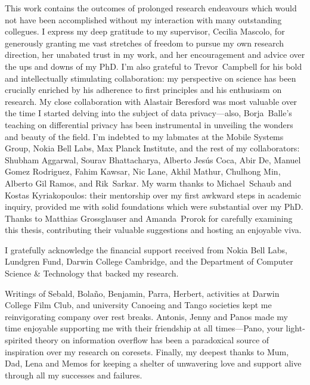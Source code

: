 
\begin{acknowledgements}
This work contains the outcomes of prolonged research endeavours which would not have been accomplished without my interaction with many outstanding collegues. I express my deep gratitude to my supervisor, Cecilia Mascolo, for generously granting me vast stretches of freedom to pursue my own research direction, her unabated trust in my work, and her encouragement and advice over the ups and downs of my PhD. I'm also grateful to \mbox{Trevor Campbell} for his bold and intellectually stimulating collaboration: my perspective on science has been crucially enriched by his adherence to first principles and his enthusiasm on research. My close collaboration with Alastair Beresford was most valuable over the time I started delving into the subject of data privacy---also, \mbox{Borja Balle's} teaching on differential privacy has been instrumental in unveiling the wonders and beauty of the field. I'm indebted to my labmates at the Mobile Systems Group, Nokia Bell Labs, Max Planck Institute, and the rest of my collaborators: Shubham Aggarwal, Sourav Bhattacharya, Alberto Jes\'{u}s Coca, Abir De, Manuel Gomez Rodriguez, Fahim Kawsar, Nic Lane,  Akhil Mathur, Chulhong Min, Alberto Gil Ramos, and \mbox{Rik Sarkar}. My warm thanks to \mbox{Michael Schaub} and Kostas Kyriakopoulos: their mentorship over my first awkward steps in academic inquiry, provided me with solid foundations which were substantial over my PhD. Thanks to Matthias Grossglauser and \mbox{Amanda Prorok} for carefully examining this thesis, contributing their valuable suggestions and hosting an enjoyable viva.

I gratefully acknowledge the financial support received from Nokia Bell Labs, Lundgren Fund, Darwin College Cambridge, and the Department of Computer Science \& Technology that backed my research. 

Writings of Sebald, Bola{\~{n}}o, Benjamin, Parra, Herbert, activities at Darwin College Film Club, and university Canoeing and Tango societies kept me reinvigorating company over rest breaks. Antonis, Jenny and Panos made my time enjoyable supporting me with their friendship at all times---Pano, your light-spirited theory on information overflow has been a paradoxical source of inspiration over my research on coresets. Finally, my deepest thanks to Mum, Dad, Lena and Memos for keeping a shelter of unwavering love and support alive through all my successes and failures.
\end{acknowledgements}
